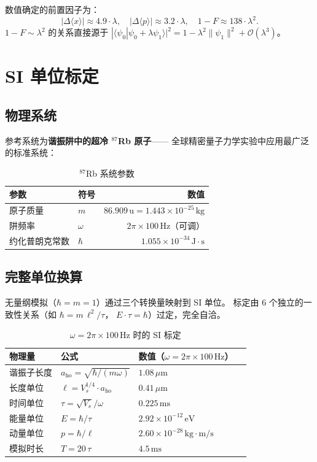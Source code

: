 \documentclass[a4paper,11pt]{article}
\begin{document}
数值确定的前置因子为：
\[
  |\Delta\langle x\rangle| \approx 4{.}9 \cdot \lambda, \quad
  |\Delta\langle p\rangle| \approx 3{.}2 \cdot \lambda, \quad
  1 - F \approx 138 \cdot \lambda^2.
\]
$1 - F \sim \lambda^2$ 的关系直接源于
$|\langle\psi_0|\psi_0 + \lambda\psi_1\rangle|^2
= 1 - \lambda^2\|\psi_1\|^2 + \mathcal{O}(\lambda^3)$。

\section{SI 单位标定}

\subsection{物理系统}

参考系统为\textbf{谐振阱中的超冷 $^{87}$Rb 原子}——
全球精密量子力学实验中应用最广泛的标准系统：

\begin{table}[h]
\centering
\caption{$^{87}$Rb 系统参数}
\begin{tabular}{llr}
\toprule
参数 & 符号 & 数值 \\
\midrule
原子质量 & $m$ & $86{.}909\,\mathrm{u} = 1{.}443 \times 10^{-25}\,\mathrm{kg}$ \\
阱频率 & $\omega$ & $2\pi \times 100\,\mathrm{Hz}$（可调） \\
约化普朗克常数 & $\hbar$ & $1{.}055 \times 10^{-34}\,\mathrm{J\cdot s}$ \\
\bottomrule
\end{tabular}
\end{table}

\subsection{完整单位换算}

无量纲模拟（$\hbar = m = 1$）通过三个转换量映射到 SI 单位。
标定由 6 个独立的一致性关系（如 $\hbar = m\,\ell^2/\tau$，
$E \cdot \tau = \hbar$）过定，完全自洽。

\begin{table}[h]
\centering
\caption{$\omega = 2\pi \times 100\,\mathrm{Hz}$ 时的 SI 标定}
\begin{tabular}{llll}
\toprule
物理量 & 公式 & 数值（$\omega = 2\pi \times 100\,\mathrm{Hz}$） \\
\midrule
谐振子长度 & $a_{\mathrm{ho}} = \sqrt{\hbar/(m\omega)}$ & $1{.}08\,\mu\mathrm{m}$ \\
长度单位 & $\ell = V_s^{1/4} \cdot a_{\mathrm{ho}}$ & $0{.}41\,\mu\mathrm{m}$ \\
时间单位 & $\tau = \sqrt{V_s}/\omega$ & $0{.}225\,\mathrm{ms}$ \\
能量单位 & $E = \hbar/\tau$ & $2{.}92 \times 10^{-12}\,\mathrm{eV}$ \\
动量单位 & $p = \hbar/\ell$ & $2{.}60 \times 10^{-28}\,\mathrm{kg\cdot m/s}$ \\
模拟时长 & $T = 20\,\tau$ & $4{.}5\,\mathrm{ms}$ \\
\bottomrule
\end{tabular}
\end{table}
\end{document}
